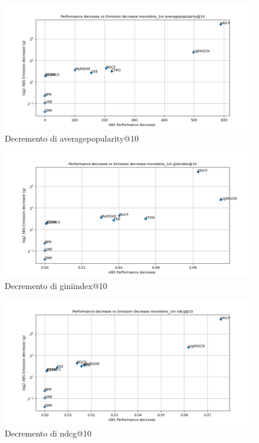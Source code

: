 \begin{figure}[H]
    \centering
     \includegraphics[width=\textwidth]{images/decrement_averagepopularity@10_movielens_1m_30_6.png}
    \caption{Decremento di averagepopularity@10}
\end{figure}

\begin{figure}[H]
    \centering
     \includegraphics[width=\textwidth]{images/decrement_giniindex@10_movielens_1m_30_6.png}
    \caption{Decremento di giniindex@10}
\end{figure}

\begin{figure}[H]
    \centering
     \includegraphics[width=\textwidth]{images/decrement_ndcg@10_movielens_1m_30_6.png}
    \caption{Decremento di ndcg@10}
\end{figure}

